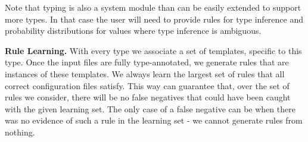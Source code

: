 Note that typing is also a system module than can be easily extended to support more types. 
In that case the user will need to provide rules for type inference and probability distributions for values where type inference is ambiguous.

{\bf {Rule Learning.}} With every type we associate a set of templates, specific to this type. Once the input files are fully type-annotated, we generate rules that are instances of these templates. We always learn the largest set of rules that all correct configuration files satisfy. This way \app can guarantee that, over the set of rules we consider, there will be no false negatives that could have been caught with the given learning set. The only case of a false negative can be when there was no evidence of such a rule in the learning set - we cannot generate rules from nothing. 
